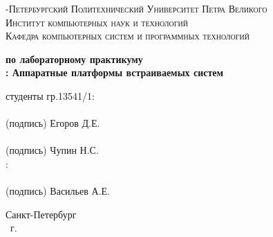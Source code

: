 \documentclass[14pt,a4paper,report]{report}
\begin{document}
\def\contentsname{Содержание}

\begin{titlepage}
	\begin{center}
		\textsc{-Петербургский Политехнический Университет Петра Великого\\[5mm]
Институт компьютерных наук и технологий\\[5mm]
Кафедра компьютерных систем и программных технологий\\[5mm]}
		
		\vfill
		
		\textbf{ по лабораторному практикуму\\[3mm]
			: Аппаратные платформы встраиваемых систем\\[15mm]
		}
	\end{center}
	
	\vfill
\begin{flushright}
	\begin{minipage}{.4\textwidth}
		{ студенты гр.13541/1:\\[2mm] 
		\underline{\hspace{2in}}\\ %
  		\centering
  		\small(подпись)
		Егоров Д.Е.\\[5mm]
		
		\underline{\hspace{2in}}\\ %
  		\centering
 		 \small(подпись)
		Чупин Н.С. \\[5mm]
				
		:\\[2mm] 
		\underline{\hspace{2in}}\\ %
  		\centering
 		 \small(подпись)
		Васильев А.Е.\\
		}
	\end{minipage}
\end{flushright}
	\vfill
	\begin{center}
		Санкт-Петербург\\ \the\year\ г.
	\end{center}
\end{titlepage}

\tableofcontents
\clearpage
\end{document}
